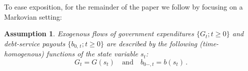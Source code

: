 \documentclass[12pt]{article}
\newtheorem{assumption}{Assumption}
\begin{document}
{To ease exposition, for the remainder of the paper we follow  \cite{LucasStokey1983} by focusing on a Markovian setting:} 
\begin{assumption}\label{assump1}
	Exogenous flows of government expenditures  $ \{G_t;t\geq 0\}$ and 
	debt-service payouts $\{b_{0,\,t}; t\geq 0 \}$ are described by the following (time-homogenous) functions of the state variable $s_t$:  
\begin{equation} \label{G_t}
G_t= G(s_t) \quad \text{and} \quad b_{0-, t} = b(s_t)\, . 
\end{equation}
\end{assumption}   
\end{document}
